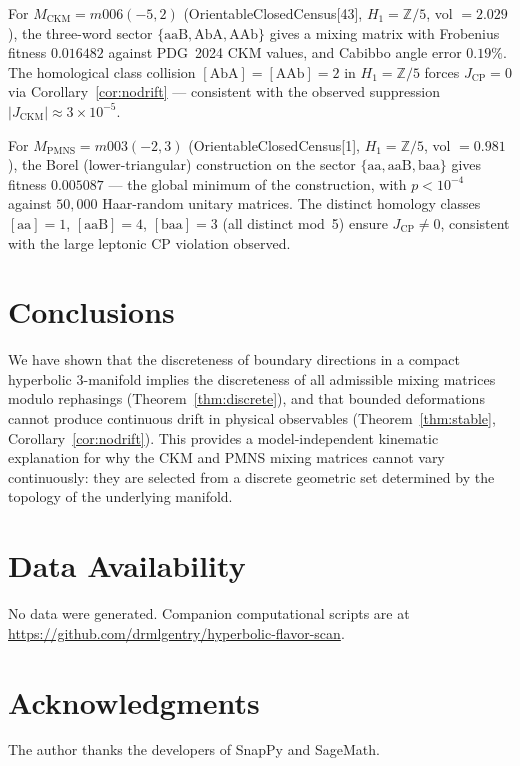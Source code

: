 \documentclass[11pt,a4paper]{article}
\theoremstyle{definition}
\theoremstyle{remark}
\begin{document}
For $M_{\mathrm{CKM}}=m006(-5,2)$ (OrientableClosedCensus[43],
$H_1=\mathbb{Z}/5$, vol $=2.029$), the three-word sector
$\{\mathrm{aaB},\mathrm{AbA},\mathrm{AAb}\}$ gives a mixing matrix
with Frobenius fitness $0.016482$ against PDG~2024 CKM values,
and Cabibbo angle error $0.19\%$.
The homological class collision $[\mathrm{AbA}]=[\mathrm{AAb}]=2$
in $H_1=\mathbb{Z}/5$ forces $J_{\mathrm{CP}}=0$ via
Corollary~\ref{cor:nodrift} --- consistent with the observed
suppression $|J_{\mathrm{CKM}}|\approx3\times10^{-5}$.

For $M_{\mathrm{PMNS}}=m003(-2,3)$ (OrientableClosedCensus[1],
$H_1=\mathbb{Z}/5$, vol $=0.981$), the Borel (lower-triangular)
construction on the sector $\{\mathrm{aa},\mathrm{aaB},\mathrm{baa}\}$
gives fitness $0.005087$ --- the global minimum of the construction,
with $p<10^{-4}$ against $50{,}000$ Haar-random unitary matrices.
The distinct homology classes $[\mathrm{aa}]=1$,
$[\mathrm{aaB}]=4$, $[\mathrm{baa}]=3$ (all distinct mod~5)
ensure $J_{\mathrm{CP}}\neq0$, consistent with the large leptonic
CP violation observed.

\section{Conclusions}

We have shown that the discreteness of boundary directions in a
compact hyperbolic 3-manifold implies the discreteness of all
admissible mixing matrices modulo rephasings (Theorem~\ref{thm:discrete}),
and that bounded deformations cannot produce continuous drift in
physical observables (Theorem~\ref{thm:stable}, Corollary~\ref{cor:nodrift}).
This provides a model-independent kinematic explanation for why
the CKM and PMNS mixing matrices cannot vary continuously: they
are selected from a discrete geometric set determined by the
topology of the underlying manifold.

\section*{Data Availability}
No data were generated. Companion computational scripts are at
\url{https://github.com/drmlgentry/hyperbolic-flavor-scan}.

\section*{Acknowledgments}
The author thanks the developers of SnapPy and SageMath.
\end{document}
